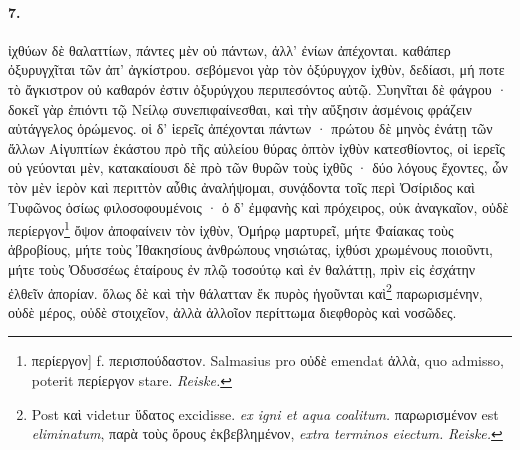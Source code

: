 \documentclass[a4paper, 11pt, oneside, polutonikogreek, german]{article}
\begin{document}
\paragraph{7.}
ἰχθύων δὲ θαλαττίων, πάντες μὲν οὐ πάντων, ἀλλ' ἐνίων ἀπέχονται. καθάπερ ὀξυρυγχῖται τῶν ἀπ' ἀγκίστρου. σεβόμενοι γὰρ τὸν ὀξύρυγχον ἰχθὺν, δεδίασι, μή ποτε τὸ ἄγκιστρον οὐ καθαρόν ἐστιν ὀξυρύγχου περιπεσόντος αὐτῷ. Συηνῖται δὲ φάγρου · δοκεῖ γὰρ ἐπιόντι τῷ Νείλῳ συνεπιφαίνεσθαι, καὶ τὴν αὔξησιν ἀσμένοις φράζειν αὐτάγγελος ὁρώμενος. οἱ δ' ἱερεῖς ἀπέχονται πάντων · πρώτου δὲ μηνὸς ἐνάτῃ τῶν ἄλλων Αἰγυπτίων ἑκάστου πρὸ τῆς αὐλείου θύρας ὀπτὸν ἰχθὺν κατεσθίοντος, οἱ ἱερεῖς οὐ γεύονται μὲν, κατακαίουσι δὲ πρὸ τῶν θυρῶν τοὺς ἰχθῦς · δύο λόγους ἔχοντες, ὧν τὸν μὲν ἱερὸν καὶ περιττὸν αὖθις ἀναλήψομαι, συνᾴδοντα τοῖς περὶ Ὀσίριδος καὶ Τυφῶνος ὁσίως φιλοσοφουμένοις · ὁ δ' ἐμφανὴς καὶ πρόχειρος, οὐκ ἀναγκαῖον, οὐδὲ περίεργον\footnote{περίεργον] f. περισπούδαστον. Salmasius pro οὐδὲ emendat ἀλλὰ, quo admisso, poterit περίεργον stare. \emph{Reiske.}} ὄψον ἀποφαίνειν τὸν ἰχθὺν, Ὁμήρῳ μαρτυρεῖ, μήτε Φαίακας τοὺς ἁβροβίους, μήτε τοὺς Ἰθακησίους ἀνθρώπους νησιώτας, ἰχθύσι χρωμένους ποιοῦντι, μήτε τοὺς Ὀδυσσέως ἑταίρους ἐν πλῷ τοσούτῳ καὶ ἐν θαλάττῃ, πρὶν εἰς ἐσχάτην ἐλθεῖν ἀπορίαν. ὅλως δὲ καὶ τὴν θάλατταν ἔκ πυρὸς ἡγοῦνται καὶ\footnote{Post καὶ videtur ὕδατος excidisse. \emph{ex igni et aqua coalitum.} παρωρισμένον est \emph{eliminatum}, παρὰ τοὺς ὅρους ἐκβεβλημένον, \emph{extra terminos eiectum.} \emph{Reiske.}} παρωρισμένην, οὐδὲ μέρος, οὐδὲ στοιχεῖον, ἀλλὰ ἀλλοῖον περίττωμα διεφθορὸς καὶ νοσῶδες.
\end{document}
